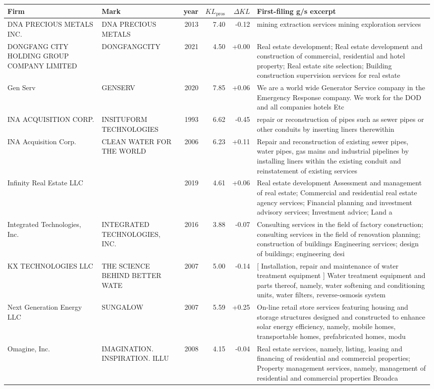 \begin{tabular}{p{4.0cm}p{2.2cm}rrrp{6.5cm}}
\toprule
Firm & Mark & year & $KL_\text{pros}$ & $\Delta KL$ & First-filing g/s excerpt \\
\midrule
DNA PRECIOUS METALS INC. & DNA PRECIOUS METALS & 2013 & 7.40 & -0.12 & mining extraction services mining exploration services \\
DONGFANG CITY HOLDING GROUP COMPANY LIMITED & DONGFANGCITY & 2021 & 4.50 & +0.00 & Real estate development; Real estate development and construction of commercial, residential and hotel property; Real estate site selection; Building construction supervision services for real estate  \\
Gen Serv & GENSERV & 2020 & 7.85 & +0.06 & We are a world wide Generator Service company in the Emergency Response company. We work for the DOD and all companies hotels Etc \\
INA ACQUISITION CORP. & INSITUFORM TECHNOLOGIES & 1993 & 6.62 & -0.45 & repair or reconstruction of pipes such as sewer pipes or other conduits by inserting liners therewithin \\
INA Acquisition Corp. & CLEAN WATER FOR THE WORLD & 2006 & 6.23 & +0.11 & Repair and reconstruction of existing sewer pipes, water pipes, gas mains and industrial pipelines by installing liners within the existing conduit and reinstatement of existing services \\
Infinity Real Estate LLC &  & 2019 & 4.61 & +0.06 & Real estate development Assessment and management of real estate; Commercial and residential real estate agency services; Financial planning and investment advisory services; Investment advice; Land a \\
Integrated Technologies, Inc. & INTEGRATED TECHNOLOGIES, INC. & 2016 & 3.88 & -0.07 & Consulting services in the field of factory construction; consulting services in the field of renovation planning; construction of buildings Engineering services; design of buildings; engineering desi \\
KX TECHNOLOGIES LLC & THE SCIENCE BEHIND BETTER WATE & 2007 & 5.00 & -0.14 & [ Installation, repair and maintenance of water treatment equipment ] Water treatment equipment and parts thereof, namely, water softening and conditioning units, water filters, reverse-osmosis system \\
Next Generation Energy LLC & SUNGALOW & 2007 & 5.59 & +0.25 & On-line retail store services featuring housing and storage structures designed and constructed to enhance solar energy efficiency, namely, mobile homes, transportable homes, prefabricated homes, modu \\
Omagine, Inc. & IMAGINATION. INSPIRATION. ILLU & 2008 & 4.15 & -0.04 & Real estate services, namely, listing, leasing and financing of residential and commercial properties; Property management services, namely, management of residential and commercial properties Broadca \\
\bottomrule
\end{tabular}
\clearpage

